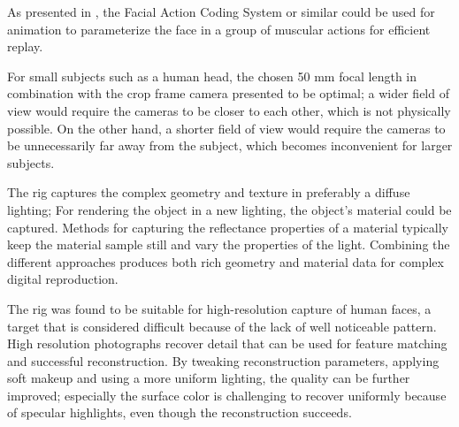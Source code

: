 As presented in \cite{deng2007computer}, the Facial Action Coding System or similar could be used for animation to parameterize the face in a group of muscular actions for efficient replay.

For small subjects such as a human head, the chosen 50 mm focal length in combination with the crop frame camera presented to be optimal; a wider field of view would require the cameras to be closer to each other, which is not physically possible.
On the other hand, a shorter field of view would require the cameras to be unnecessarily far away from the subject, which becomes inconvenient for larger subjects.

The rig captures the complex geometry and texture in preferably a diffuse lighting;
For rendering the object in a new lighting, the object's material could be captured.
Methods for capturing the reflectance properties of a material typically keep the material sample still and vary the properties of the light. \cite{debevec2000acquiring} \cite{aittala2013practical}
Combining the different approaches produces both rich geometry and material data for complex digital reproduction.




The rig was found to be suitable for high-resolution capture of human faces, a target that is considered difficult because of the lack of well noticeable pattern.
High resolution photographs recover detail that can be used for feature matching and successful reconstruction.
By tweaking reconstruction parameters, applying soft makeup and using a more uniform lighting, the quality can be further improved;
especially the surface color is challenging to recover uniformly because of specular highlights, even though the reconstruction succeeds.

